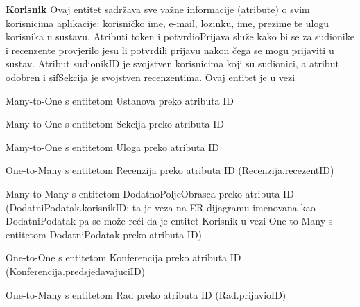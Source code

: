 				\textbf{Korisnik}
				Ovaj entitet sadržava sve važne informacije (atribute) o svim korisnicima aplikacije: korisničko ime, e-mail, lozinku, ime, prezime te ulogu korisnika u sustavu. Atributi token i potvrdioPrijava služe kako bi se za sudionike i recenzente provjerilo jesu li potvrdili prijavu nakon čega se mogu prijaviti u sustav. Atribut sudionikID je svojstven korisnicima koji su sudionici, a atribut odobren i sifSekcija je svojstven recenzentima. Ovaj entitet je u vezi \begin{packed_item} 
					\item Many-to-One s entitetom Ustanova preko atributa ID
					\item Many-to-One s entitetom Sekcija preko atributa ID
					\item Many-to-One s entitetom Uloga preko atributa ID
					\item One-to-Many s entitetom Recenzija preko atributa ID (Recenzija.recezentID)
					\item Many-to-Many s entitetom DodatnoPoljeObrasca preko atributa ID (DodatniPodatak.korisnikID; ta je veza na ER dijagramu imenovana kao DodatniPodatak pa se može reći da je entitet Korisnik u vezi One-to-Many s entitetom DodatniPodatak preko atributa ID)
					\item One-to-One s entitetom Konferencija preko atributa ID \newline (Konferencija.predsjedavajuciID)
					\item One-to-Many s entitetom Rad preko atributa ID (Rad.prijavioID)
				\end{packed_item}
